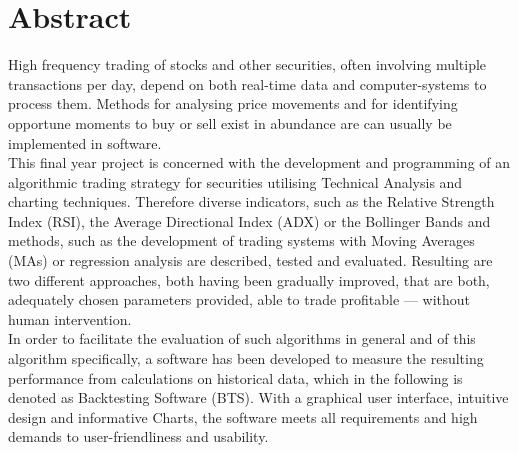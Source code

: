 \chapter*{Abstract}

High frequency trading of stocks and other securities, often involving multiple transactions per day, depend on both real-time data
and computer-systems to process them.
Methods for analysing price movements and for identifying opportune moments to buy or sell exist in abundance are can usually be
implemented in software.\\

This final year project is concerned with the development and programming of an algorithmic trading strategy for securities
utilising Technical Analysis and charting techniques. 
Therefore diverse indicators, such as the Relative Strength Index (RSI), the Average Directional Index (ADX) or the Bollinger Bands and methods, such as the development of trading systems
with Moving Averages (MAs) or regression analysis are described, tested and evaluated. Resulting are two different approaches, both having been
gradually improved, that are both, adequately chosen parameters provided, able to trade profitable --- without human intervention.\\

In order to facilitate the evaluation of such algorithms in general and of this algorithm specifically, a software has been developed to
measure the resulting performance from calculations on historical data, which in the following is denoted as Backtesting Software (BTS).
With a graphical user interface, intuitive design and informative Charts, the software meets all requirements and high demands to user-friendliness and usability.